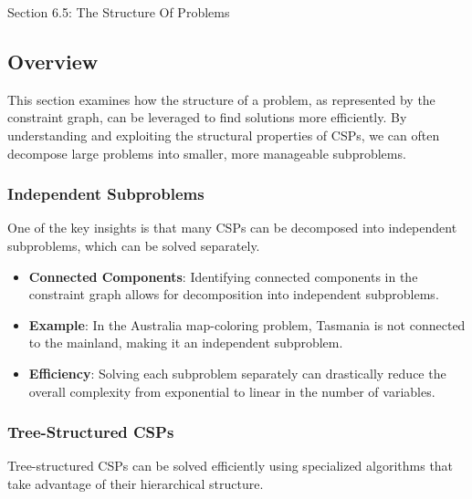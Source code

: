 \begin{notes}{Section 6.5: The Structure Of Problems}
    \subsection*{Overview}

    This section examines how the structure of a problem, as represented by the constraint graph, can be leveraged to find solutions more efficiently. By understanding and exploiting the structural 
    properties of CSPs, we can often decompose large problems into smaller, more manageable subproblems.
    
    \subsubsection*{Independent Subproblems}
    
    One of the key insights is that many CSPs can be decomposed into independent subproblems, which can be solved separately.
    
    \begin{highlight}
    
        \begin{itemize}
            \item \textbf{Connected Components}: Identifying connected components in the constraint graph allows for decomposition into independent subproblems.
            \item \textbf{Example}: In the Australia map-coloring problem, Tasmania is not connected to the mainland, making it an independent subproblem.
            \item \textbf{Efficiency}: Solving each subproblem separately can drastically reduce the overall complexity from exponential to linear in the number of variables.
        \end{itemize}
    
    \end{highlight}
    
    \subsubsection*{Tree-Structured CSPs}
    
    Tree-structured CSPs can be solved efficiently using specialized algorithms that take advantage of their hierarchical structure.
    
    \begin{highlight}
    

\end{highlight}
\end{notes}
